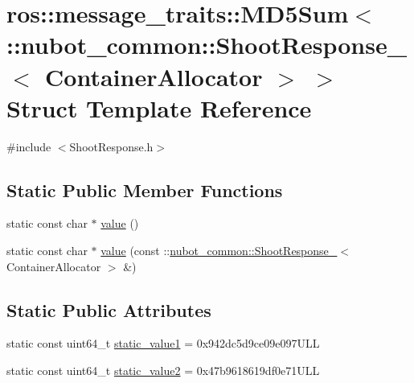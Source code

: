 \hypertarget{structros_1_1message__traits_1_1MD5Sum_3_01_1_1nubot__common_1_1ShootResponse___3_01ContainerAllocator_01_4_01_4}{\section{ros\-:\-:message\-\_\-traits\-:\-:M\-D5\-Sum$<$ \-:\-:nubot\-\_\-common\-:\-:Shoot\-Response\-\_\-$<$ Container\-Allocator $>$ $>$ Struct Template Reference}
\label{structros_1_1message__traits_1_1MD5Sum_3_01_1_1nubot__common_1_1ShootResponse___3_01ContainerAllocator_01_4_01_4}
}


{\ttfamily \#include $<$Shoot\-Response.\-h$>$}

\subsection*{Static Public Member Functions}
\begin{DoxyCompactItemize}
\item 
static const char $\ast$ \hyperlink{structros_1_1message__traits_1_1MD5Sum_3_01_1_1nubot__common_1_1ShootResponse___3_01ContainerAllocator_01_4_01_4_affce5c65df9cf9661e60d53e233bcfec}{value} ()
\item 
static const char $\ast$ \hyperlink{structros_1_1message__traits_1_1MD5Sum_3_01_1_1nubot__common_1_1ShootResponse___3_01ContainerAllocator_01_4_01_4_a241d0ef777111bf4559cae12527d4591}{value} (const \-::\hyperlink{structnubot__common_1_1ShootResponse__}{nubot\-\_\-common\-::\-Shoot\-Response\-\_\-}$<$ Container\-Allocator $>$ \&)
\end{DoxyCompactItemize}
\subsection*{Static Public Attributes}
\begin{DoxyCompactItemize}
\item 
static const uint64\-\_\-t \hyperlink{structros_1_1message__traits_1_1MD5Sum_3_01_1_1nubot__common_1_1ShootResponse___3_01ContainerAllocator_01_4_01_4_ac31bb8c3216fc8efbca4f20a16e3eccb}{static\-\_\-value1} = 0x942dc5d9ce09e097\-U\-L\-L
\item 
static const uint64\-\_\-t \hyperlink{structros_1_1message__traits_1_1MD5Sum_3_01_1_1nubot__common_1_1ShootResponse___3_01ContainerAllocator_01_4_01_4_a9504aa84a07e5c8cb978cc55d9b1167e}{static\-\_\-value2} = 0x47b9618619df0e71\-U\-L\-L
\end{DoxyCompactItemize}


